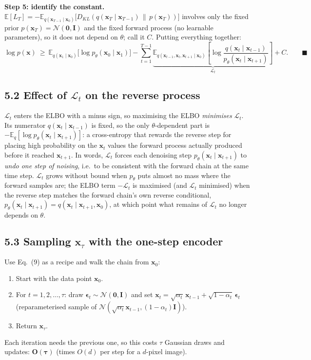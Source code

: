 \documentclass[11pt,a4paper]{article}
\newcommand{\E}{\mathbb{E}}
\newcommand{\N}{\mathcal{N}}
\newcommand{\x}{\mathbf{x}}
\begin{document}
\textbf{Step 5: identify the constant.}
$\E[L_T] = -\E_{q(\x_{T-1}\mid\x_0)}\big[D_{KL}(q(\x_T\mid\x_{T-1})\,\|\,p(\x_T))\big]$ involves only the fixed prior $p(\x_T)=\N(\mathbf{0},\mathbf{I})$ and the fixed forward process (no learnable parameters), so it does not depend on $\theta$; call it $C$. Putting everything together:
\[
\log p(\x)\ \ge\ \E_{q(\x_1\mid\x_0)}\big[\log p_\theta(\x_0\mid\x_1)\big]
-\sum_{t=1}^{T-1}\underbrace{\E_{q(\x_{t-1},\x_t,\x_{t+1}\mid\x_0)}\!\left[\log\frac{q(\x_t\mid\x_{t-1})}{p_\theta(\x_t\mid\x_{t+1})}\right]}_{\mathcal{L}_t}
+C. \qquad\blacksquare
\]

\subsection*{5.2 Effect of $\mathcal{L}_t$ on the reverse process}

$\mathcal{L}_t$ enters the ELBO with a minus sign, so maximising the ELBO \emph{minimises} $\mathcal{L}_t$. Its numerator $q(\x_t\mid\x_{t-1})$ is fixed, so the only $\theta$-dependent part is $-\E_q[\log p_\theta(\x_t\mid\x_{t+1})]$: a cross-entropy that rewards the reverse step for placing high probability on the $\x_t$ values the forward process actually produced before it reached $\x_{t+1}$. In words, $\mathcal{L}_t$ forces each denoising step $p_\theta(\x_t\mid\x_{t+1})$ to \emph{undo one step of noising}, i.e.\ to be consistent with the forward chain at the same time step.
$\mathcal{L}_t$ grows without bound when $p_\theta$ puts almost no mass where the forward samples are; the ELBO term $-\mathcal{L}_t$ is maximised (and $\mathcal{L}_t$ minimised) when the reverse step matches the forward chain's own reverse conditional, $p_\theta(\x_t\mid\x_{t+1}) = q(\x_t\mid\x_{t+1},\x_0)$, at which point what remains of $\mathcal{L}_t$ no longer depends on $\theta$.

\subsection*{5.3 Sampling $\x_\tau$ with the one-step encoder}

Use Eq.~(9) as a recipe and walk the chain from $\x_0$:
\begin{enumerate}[nosep]
\item Start with the data point $\x_0$.
\item For $t=1,2,\dots,\tau$: draw $\bm{\epsilon}_t\sim\N(\mathbf{0},\mathbf{I})$ and set $\x_t=\sqrt{\alpha_t}\,\x_{t-1}+\sqrt{1-\alpha_t}\,\bm{\epsilon}_t$ (reparameterised sample of $\N(\sqrt{\alpha_t}\x_{t-1},(1-\alpha_t)\mathbf{I})$).
\item Return $\x_\tau$.
\end{enumerate}
Each iteration needs the previous one, so this costs $\tau$ Gaussian draws and updates: $\bm{O(\tau)}$ (times $O(d)$ per step for a $d$-pixel image).
\end{document}
